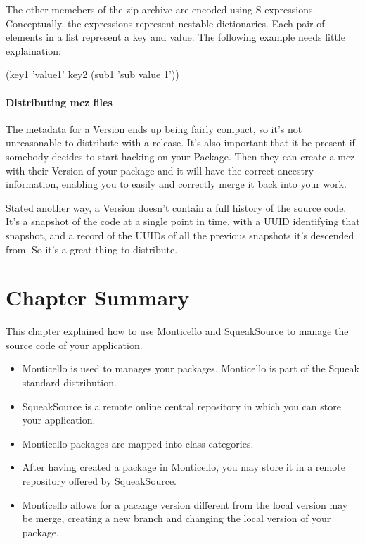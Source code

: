 \documentclass[a4paper,10pt,twoside]{book}
\begin{document}
The other memebers of the zip archive are encoded using S-expressions. Conceptually, the expressions represent nestable dictionaries. Each pair of elements in a list represent a key and value. The following example needs little explaination:

(key1 'value1' key2 (sub1 'sub value 1'))

\paragraph{Distributing mcz files}

The metadata for a Version ends up being fairly compact, so it's not unreasonable to distribute with a release. It's also important that it be present if somebody decides to start hacking on your Package. Then they can create a mcz with their Version of your package and it will have the correct ancestry information, enabling you to easily and correctly merge it back into your work.

Stated another way, a Version doesn't contain a full history of the source code. It's a snapshot of the code at a single point in time, with a UUID identifying that snapshot, and a record of the UUIDs of all the previous snapshots it's descended from. So it's a great thing to distribute.




\section{Chapter Summary}

This chapter explained how to use Monticello and SqueakSource to manage the source code of your application.

\begin{itemize}
\item Monticello is used to manages your packages. Monticello is part of the Squeak standard distribution.

\item SqueakSource is a remote online central repository in which you can store your application.

\item Monticello packages are mapped into class categories. 

\item After having created a package in Monticello, you may store it in a remote repository offered by SqueakSource.

\item Monticello allows for a package version different from the local version may be merge, creating a new branch and changing the local version of your package.
\end{itemize}
\end{document}
